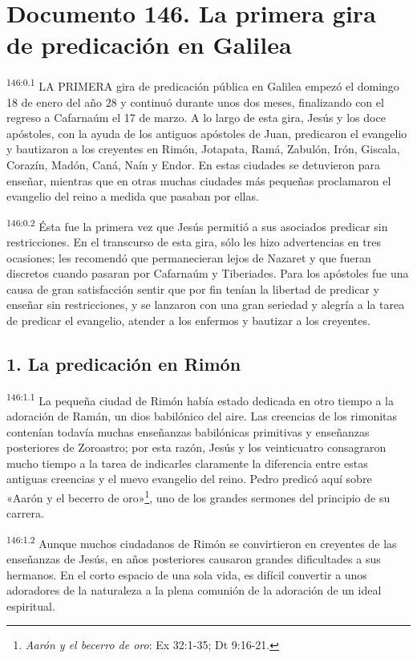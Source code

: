 \chapter{Documento 146. La primera gira de predicación en Galilea}
\par 
\textsuperscript{146:0.1} LA PRIMERA gira de predicación pública en Galilea empezó el domingo 18 de enero del año 28 y continuó durante unos dos meses, finalizando con el regreso a Cafarnaúm el 17 de marzo. A lo largo de esta gira, Jesús y los doce apóstoles, con la ayuda de los antiguos apóstoles de Juan, predicaron el evangelio y bautizaron a los creyentes en Rimón, Jotapata, Ramá, Zabulón, Irón, Giscala, Corazín, Madón, Caná, Naín y Endor. En estas ciudades se detuvieron para enseñar, mientras que en otras muchas ciudades más pequeñas proclamaron el evangelio del reino a medida que pasaban por ellas.

\par 
\textsuperscript{146:0.2} Ésta fue la primera vez que Jesús permitió a sus asociados predicar sin restricciones. En el transcurso de esta gira, sólo les hizo advertencias en tres ocasiones; les recomendó que permanecieran lejos de Nazaret y que fueran discretos cuando pasaran por Cafarnaúm y Tiberiades. Para los apóstoles fue una causa de gran satisfacción sentir que por fin tenían la libertad de predicar y enseñar sin restricciones, y se lanzaron con una gran seriedad y alegría a la tarea de predicar el evangelio, atender a los enfermos y bautizar a los creyentes.

\section*{1. La predicación en Rimón}
\par 
\textsuperscript{146:1.1} La pequeña ciudad de Rimón había estado dedicada en otro tiempo a la adoración de Ramán, un dios babilónico del aire. Las creencias de los rimonitas contenían todavía muchas enseñanzas babilónicas primitivas y enseñanzas posteriores de Zoroastro; por esta razón, Jesús y los veinticuatro consagraron mucho tiempo a la tarea de indicarles claramente la diferencia entre estas antiguas creencias y el nuevo evangelio del reino. Pedro predicó aquí sobre «Aarón y el becerro de oro»\footnote{\textit{Aarón y el becerro de oro}: Ex 32:1-35; Dt 9:16-21.}, uno de los grandes sermones del principio de su carrera.

\par 
\textsuperscript{146:1.2} Aunque muchos ciudadanos de Rimón se convirtieron en creyentes de las enseñanzas de Jesús, en años posteriores causaron grandes dificultades a sus hermanos. En el corto espacio de una sola vida, es difícil convertir a unos adoradores de la naturaleza a la plena comunión de la adoración de un ideal espiritual.

